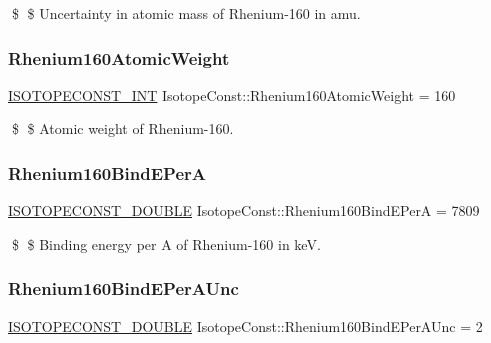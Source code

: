 \$ \$ Uncertainty in atomic mass of Rhenium-\/160 in amu. \mbox{\label{group___isotope_const-_rhenium-_re160_ga196fc177a8613969dc9fcecbae49af74}} 
\subsubsection{\texorpdfstring{Rhenium160\+Atomic\+Weight}{Rhenium160AtomicWeight}}
{\footnotesize\ttfamily \mbox{\hyperlink{group___isotope_const-_macros_ga5f18360b3e99483a35c32d789e62621c}{I\+S\+O\+T\+O\+P\+E\+C\+O\+N\+S\+T\+\_\+\+I\+NT}} Isotope\+Const\+::\+Rhenium160\+Atomic\+Weight = 160}

\$ \$ Atomic weight of Rhenium-\/160. \mbox{\label{group___isotope_const-_rhenium-_re160_ga20e4a9f852241c8c79ad712e96b81420}} 
\subsubsection{\texorpdfstring{Rhenium160\+Bind\+E\+PerA}{Rhenium160BindEPerA}}
{\footnotesize\ttfamily \mbox{\hyperlink{group___isotope_const-_macros_ga8f45a7272ce02c0b4c65c44636ed719a}{I\+S\+O\+T\+O\+P\+E\+C\+O\+N\+S\+T\+\_\+\+D\+O\+U\+B\+LE}} Isotope\+Const\+::\+Rhenium160\+Bind\+E\+PerA = 7809}

\$ \$ Binding energy per A of Rhenium-\/160 in keV. \mbox{\label{group___isotope_const-_rhenium-_re160_gaadc97a34e8e884363d8d99983bcabd58}} 
\subsubsection{\texorpdfstring{Rhenium160\+Bind\+E\+Per\+A\+Unc}{Rhenium160BindEPerAUnc}}
{\footnotesize\ttfamily \mbox{\hyperlink{group___isotope_const-_macros_ga8f45a7272ce02c0b4c65c44636ed719a}{I\+S\+O\+T\+O\+P\+E\+C\+O\+N\+S\+T\+\_\+\+D\+O\+U\+B\+LE}} Isotope\+Const\+::\+Rhenium160\+Bind\+E\+Per\+A\+Unc = 2}

